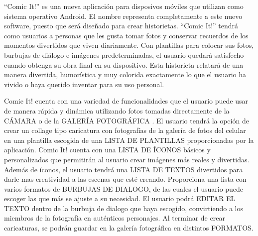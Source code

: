 \documentclass[12pt]{report}
\begin{document}
``Comic It!'' es una nueva aplicación para disposivos móviles que utilizan como sistema operativo Android. El nombre representa completamente a este nuevo software, puesto que será diseñado para crear historietas.
\newline
\newline
``Comic It!'' tendrá como usuarios a personas que les gusta tomar fotos y conservar recuerdos de los momentos divertidos que viven diariamente.
\newline
\newline
Con plantillas para colocar sus fotos, burbujas de diálogo e imágenes predeterminadas, el usuario quedará satisfecho cuando obtenga su obra final en su dispositivo.
\newline
\newline
Esta historieta relatará de una manera divertida, humorística y muy colorida exactamente lo que el usuario ha vivido o haya querido inventar para su uso personal.
	

Comic It! cuenta con una variedad de funcionalidades que el usuario puede usar de manera rápida y dinámica utilizando 				fotos tomadas directamente de la CÁMARA o de la GALERÍA FOTOGRÁFICA .
\newline
\newline
El usuario tendrá la opción de crear un collage tipo caricatura  con fotografías de la galería de fotos del celular en una plantilla escogida de una LISTA DE PLANTILLAS proporcionadas por la aplicación.
\newline
\newline
Comic It! cuenta con una LISTA DE ÍCONOS básicos y personalizados que permitirán al usuario crear imágenes más reales y divertidas.	
\newline
\newline	
Además de íconos, el usuario tendrá una LISTA DE TEXTOS divertidos para darle mas creatividad a las escenas que esté creando.
\newline
\newline
Proporciona una lista con varios formatos de BURBUJAS DE DIALOGO, de las cuales el usuario puede escoger las que más se ajuste a su necesidad. El usuario podrá EDITAR EL TEXTO dentro de la burbuja de dialogo que haya escogido, convirtiendo a los miembros de 		la fotografía en auténticos personajes.
\newline
\newline
Al terminar de crear caricaturas, se podrán guardar en la galería fotográfica en distintos FORMATOS.
\end{document}
